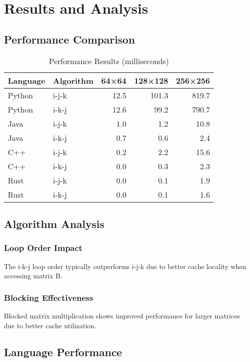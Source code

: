 \documentclass[11pt,a4paper]{article}
\begin{document}
\section{Results and Analysis}

\subsection{Performance Comparison}


\begin{table}[H]
\centering
\caption{Performance Results (milliseconds)}
\begin{tabular}{llrrr}
\toprule
Language & Algorithm & 64×64 & 128×128 & 256×256 \\
\midrule
Python & i-j-k & 12.5 & 101.3 & 819.7 \\
Python & i-k-j & 12.6 & 99.2 & 790.7 \\
Java & i-j-k & 1.0 & 1.2 & 10.8 \\
Java & i-k-j & 0.7 & 0.6 & 2.4 \\
C++ & i-j-k & 0.2 & 2.2 & 15.6 \\
C++ & i-k-j & 0.0 & 0.3 & 2.3 \\
Rust & i-j-k & 0.0 & 0.1 & 1.9 \\
Rust & i-k-j & 0.0 & 0.1 & 1.6 \\
\bottomrule
\end{tabular}
\end{table}

\subsection{Algorithm Analysis}

\subsubsection{Loop Order Impact}
The i-k-j loop order typically outperforms i-j-k due to better cache locality when accessing matrix B.

\subsubsection{Blocking Effectiveness}
Blocked matrix multiplication shows improved performance for larger matrices due to better cache utilization.

\subsection{Language Performance}
\end{document}
